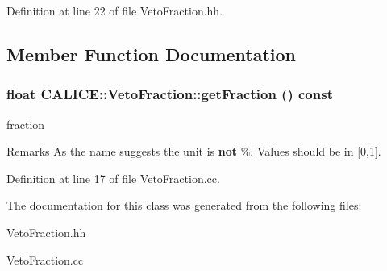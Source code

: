 Definition at line 22 of file VetoFraction.hh.

\subsection{Member Function Documentation}
\subsubsection[{getFraction}]{\setlength{\rightskip}{0pt plus 5cm}float CALICE::VetoFraction::getFraction () const}\label{classCALICE_1_1VetoFraction_adcff26d17db7f0cea85ab846f8debaa6}


fraction \begin{DoxyRemark}{Remarks}
As the name suggests the unit is {\bfseries not} \%. Values should be in [0,1]. 
\end{DoxyRemark}


Definition at line 17 of file VetoFraction.cc.

The documentation for this class was generated from the following files:\begin{DoxyCompactItemize}
\item 
VetoFraction.hh\item 
VetoFraction.cc\end{DoxyCompactItemize}
